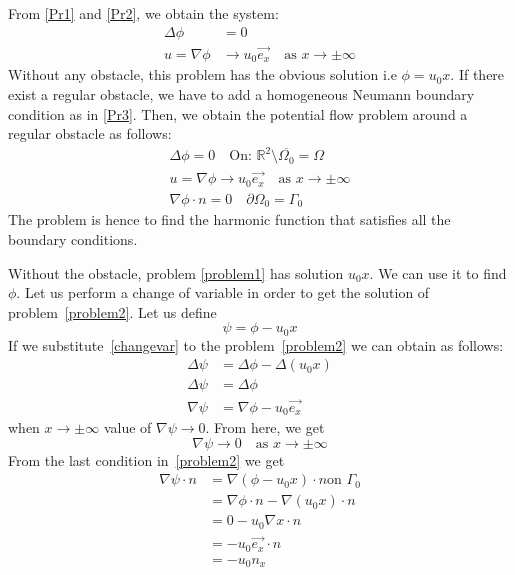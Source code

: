 \documentclass[a4paper,12pt]{article}
\begin{document}
From \eqref{Pr1} and \eqref{Pr2}, we obtain the system:
\begin{align} \label{problem1}
\Delta \phi &=0\\
u=\nabla \phi &\to u_0 \vec{e_x} \quad \text{as } x\to\pm\infty
\end{align}
Without any obstacle, this problem has the obvious solution i.e $\phi= u_0 x$. If there exist a regular obstacle, we have to add a homogeneous Neumann boundary condition as in \eqref{Pr3}.
Then, we obtain the potential flow problem around a regular obstacle as follows:
\begin{align} \label{problem2}
\Delta \phi=0 \quad \text{On: } \mathbb{R}^2 \setminus \overline{\Omega_0}=\Omega\\
u=\nabla\phi\to u_0\vec{e_x}\quad \text{as } x \to \pm\infty\\
\nabla\phi \cdot n=0 \quad \partial \Omega_0=\Gamma_0
\end{align}
The problem is hence to find the harmonic function that satisfies all the boundary conditions.

Without the obstacle, problem \eqref{problem1} has solution $u_0x$. We can use it to find $\phi$. Let us perform a change of variable in order to get the solution of problem~\eqref{problem2}.
Let us define 
\begin{equation}
\psi=\phi-u_0 x \label{changevar} 
\end{equation}
If we substitute~\eqref{changevar} to the problem~\eqref{problem2} we can obtain as follows:
\begin{align}
 \Delta \psi &= \Delta \phi-\Delta (u_0x)\\
\Delta \psi &= \Delta \phi\\
\nabla \psi &= \nabla\phi-u_0\vec{e_x}
\end{align}
when $x\to\pm\infty$ value of $\nabla \psi\to 0$.
From here, we get 
\begin{equation}
 \nabla\psi\to0 \quad \text{as } x\to\pm\infty
\end{equation}
From the last condition in~\eqref{problem2} we get
\begin{align} 
\nabla\psi\cdot n &= \nabla(\phi-u_0 x)\cdot n \text{on } \Gamma_0\\
&=\nabla\phi \cdot n - \nabla(u_0 x)\cdot n\\
&=0-u_0\nabla x\cdot n\\
&=-u_0 \vec{e_x} \cdot n\\
&=-u_0 n_x
\end{align}
\end{document}
